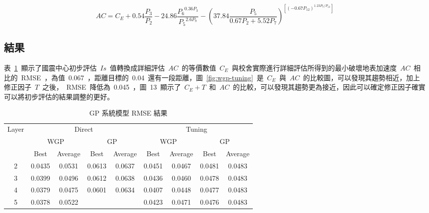 \begin{equation} AC = C_E + 0.54 \dfrac{P_3}{P_2} - 24.86 \dfrac{ {P_6}^{0.36P_3} }{ {P_5}^{2.6P_9} } - ( 37.84 \dfrac{P_5}{0.67P_2 + 5.52P_7} )^{\left[ (-0.67 P_{12})^{1.23P_7/P_{13}} \right]} \label{eq:WGP_AC_IS}\end{equation}


\subsection{結果}

表~\ref{tab:gp-result}~顯示了國震中心初步評估~$Is$~值轉換成詳細評估~$AC$~的等價數值~$C_E$~與校舍實際進行詳細評估所得到的最小破壞地表加速度~$AC$~相比的~RMSE~，為值~0.067~，距離目標的~0.04~還有一段距離，圖~\ref{fig:wgp-tuning}~是~$C_E$~與~$AC$~的比較圖，可以發現其趨勢相近，加上修正因子~$T$~之後，~RMSE~降低為~0.045~，圖~13~顯示了~$C_E + T$~和~$AC$~的比較，可以發現其趨勢更為接近，因此可以確定修正因子確實可以將初步評估的結果調整的更好。


{\renewcommand{\arraystretch}{1.5}
\begin{table}[hbtp]
  \begin{center}
    \caption{GP 系統模型 RMSE 結果}
    \label{tab:gp-result}
    \begin{tabular}{c c c c c c c c c}
      \hline
      \multirow{3}{*}{Layer} & \multicolumn{4}{c}{Direct} & \multicolumn{4}{c}{Tuning} \\
       & \multicolumn{2}{c}{WGP} & \multicolumn{2}{c}{GP} & \multicolumn{2}{c}{WGP} & \multicolumn{2}{c}{GP} \\
       & Best & Average & Best & Average & Best & Average & Best & Average \\
      \hline
      2 & 0.0435 & 0.0531 & 0.0613 & 0.0637 & 0.0451 & 0.0467 & 0.0481 & 0.0483 \\
      3 & 0.0399 & 0.0496 & 0.0612 & 0.0638 & 0.0436 & 0.0460 & 0.0478 & 0.0483 \\
      4 & 0.0379 & 0.0475 & 0.0601 & 0.0634 & 0.0407 & 0.0448 & 0.0477 & 0.0483 \\
      5 & 0.0378 & 0.0522 &            &            & 0.0423 & 0.0471 & 0.0476 & 0.0483 \\
      \hline
      \end{tabular}
  \end{center}
\end{table}
}

